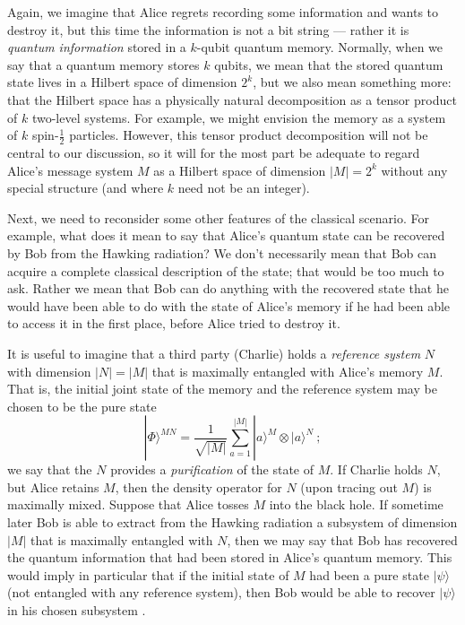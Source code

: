\documentclass[12pt]{article}
\begin{document}
Again, we imagine that Alice regrets recording some information and wants to destroy it, but this time the information is not a bit string --- rather it is {\em quantum information} stored in a $k$-qubit quantum memory. Normally, when we say that a quantum memory stores $k$ qubits, we mean that the stored quantum state lives in a Hilbert space of dimension $2^k$, but we also mean something more: that the Hilbert space has a physically natural decomposition as a tensor product of $k$ two-level systems. For example, we might envision the memory as a system of $k$ spin-$\frac{1}{2}$ particles. However, this tensor product decomposition will not be central to our discussion, so it will for the most part be adequate to regard Alice's message system $M$ as a Hilbert space of dimension $|M| =2^k$ without any special structure (and where $k$ need not be an integer).

Next, we need to reconsider some other features of the classical scenario. For example, what does it mean to say that Alice's quantum state can be recovered by Bob from the Hawking radiation? We don't necessarily mean that Bob can acquire a complete classical description of the state; that would be too much to ask. Rather we mean that Bob can do anything with the recovered state that he would have been able to do with the state of Alice's memory if he had been able to access it in the first place, before Alice tried to destroy it. 

It is useful to imagine that a third party (Charlie) holds a {\em reference system} $N$ with dimension $|N|=|M|$ that is maximally entangled with Alice's memory $M$. That is, the initial joint state of the memory and the reference system may be chosen to be the pure state
\begin{equation}
|\Phi\rangle^{MN}=\frac{1}{\sqrt{|M|}}\sum_{a=1}^{|M|} |a\rangle^M\otimes |a\rangle^N~;
\end{equation}
we say that the $N$ provides a {\em purification} of the state of $M$. If Charlie holds $N$, but Alice retains $M$, then the density operator for $N$ (upon tracing out $M$) is maximally mixed. Suppose that Alice tosses $M$ into the black hole. If sometime later Bob is able to extract from the Hawking radiation a subsystem of dimension $|M|$ that is maximally entangled with $N$, then we may say that Bob has recovered the quantum information that had been stored in Alice's quantum memory. This would imply in particular that if the initial state of $M$ had been a pure state $|\psi\rangle$ (not entangled with any reference system), then Bob would be able to recover $|\psi\rangle$ in his chosen subsystem \cite{barnum}.
\end{document}
